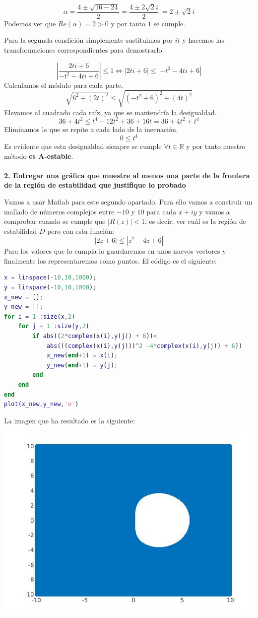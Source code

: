 \documentclass[a4paper,11pt,spanish,leqno]{article}
\begin{document}
\[ \alpha = \frac{4 \pm \sqrt{16 - 24}}{2} = \frac{4 \pm 2\sqrt{2}i}{2}\ = 2 \pm \sqrt{2}i\]
Podemos ver que $Re(\alpha) = 2 > 0$ y por tanto $1$ se cumple.

Para la segunda condición simplemente sustituimos por $it$ y hacemos las transformaciones correspondientes para demostrarlo.

\[ \left| \frac{2ti + 6}{-t^2 - 4ti + 6} \right| \leq 1  \iff |2ti + 6|  \leq |-t^2 - 4ti + 6| \]
Calculamos el módulo para cada parte.
\[ \sqrt{6^2 + (2t)^2} \leq \sqrt{(-t^2 + 6)^2 + (4t)^2}\]
Elevamos al cuadrado cada raíz, ya que se mantendría la desigualdad.
\[ 36 + 4t^2 \leq t^4 - 12t^2 + 36 + 16t = 36 + 4t^2 + t^4 \]
Eliminamos lo que se repite a cada lado de la inecuación.
\[ 0 \leq t^4\]
Es evidente que esta desigualdad siempre se cumple $\forall t \in \mathbb{R}$ y por tanto nuestro método \textbf{es A-estable}.

\paragraph{}\textbf{2. Entregar una gráfica que muestre al menos una parte de la frontera de la región de estabilidad que justifique lo probado}

Vamos a usar Matlab para este segundo apartado. Para ello vamos a construir un mallado de números complejos entre $-10$ y $10$ para cada $x + iy$ y vamos a comprobar cuando se cumple que $|R(z)| < 1$, es decir, ver cuál es la región de estabilidad $D$ pero con esta función:
\[|2z + 6|  \leq |z^2 - 4z + 6| \]
Para los valores que lo cumpla lo guardaremos en unos nuevos vectores y finalmente los representaremos como puntos. El código es el siguiente:
\begin{lstlisting}[language=Matlab]
x = linspace(-10,10,1000);
y = linspace(-10,10,1000);
x_new = [];
y_new = [];
for i = 1 :size(x,2)
    for j = 1 :size(y,2)
        if abs((2*complex(x(i),y(j)) + 6))< 
            abs(((complex(x(i),y(j)))^2 -4*complex(x(i),y(j)) + 6)) 
            x_new(end+1) = x(i);
            y_new(end+1) = y(j);
        end
    end
end
plot(x_new,y_new,'o')
\end{lstlisting}

La imagen que ha resultado es la siguiente:

\includegraphics[scale=0.5]{Tarea9.jpg}
\end{document}
